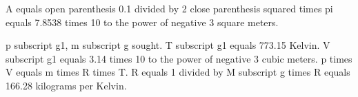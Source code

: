 A equals open parenthesis 0.1 divided by 2 close parenthesis squared times pi equals 7.8538 times 10 to the power of negative 3 square meters.  

p subscript g1, m subscript g sought.  
T subscript g1 equals 773.15 Kelvin.  
V subscript g1 equals 3.14 times 10 to the power of negative 3 cubic meters.  
p times V equals m times R times T.  
R equals 1 divided by M subscript g times R equals 166.28 kilograms per Kelvin.